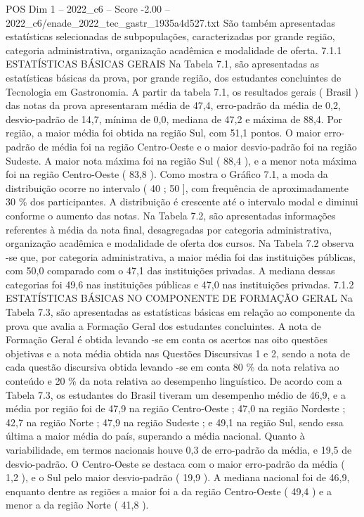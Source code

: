 \begin{textsample}{POS Dim 1 – 2022\_c6 – Score -2.00 – 2022\_c6/enade\_2022\_tec\_gastr\_1935a4d527.txt}
São também apresentadas estatísticas selecionadas de subpopulações, caracterizadas por grande região, categoria administrativa, organização acadêmica e modalidade de oferta. 7.1.1 ESTATÍSTICAS BÁSICAS GERAIS Na Tabela 7.1, são apresentadas as estatísticas básicas da prova, por grande região, dos estudantes concluintes de Tecnologia em Gastronomia.
A partir da tabela 7.1, os resultados gerais ( Brasil ) das notas da prova apresentaram média de 47,4, erro-padrão da média de 0,2, desvio-padrão de 14,7, mínima de 0,0, mediana de 47,2 e máxima de 88,4.
Por região, a maior média foi obtida na região Sul, com 51,1 pontos.
O maior erro-padrão de média foi na região Centro-Oeste e o maior desvio-padrão foi na região Sudeste.
A maior nota máxima foi na região Sul ( 88,4 ), e a menor nota máxima foi na região Centro-Oeste ( 83,8 ).
Como mostra o Gráfico 7.1, a moda da distribuição ocorre no intervalo ( 40 ; 50 ], com frequência de aproximadamente 30 \% dos participantes.
A distribuição é crescente até o intervalo modal e diminui conforme o aumento das notas.
Na Tabela 7.2, são apresentadas informações referentes à média da nota final, desagregadas por categoria administrativa, organização acadêmica e modalidade de oferta dos cursos.
Na Tabela 7.2 observa -se que, por categoria administrativa, a maior média foi das instituições públicas, com 50,0 comparado com o 47,1 das instituições privadas.
A mediana dessas categorias foi 49,6 nas instituições públicas e 47,0 nas instituições privadas. 7.1.2 ESTATÍSTICAS BÁSICAS NO COMPONENTE DE FORMAÇÃO GERAL Na Tabela 7.3, são apresentadas as estatísticas básicas em relação ao componente da prova que avalia a Formação Geral dos estudantes concluintes.
A nota de Formação Geral é obtida levando -se em conta os acertos nas oito questões objetivas e a nota média obtida nas Questões Discursivas 1 e 2, sendo a nota de cada questão discursiva obtida levando -se em conta 80 \% da nota relativa ao conteúdo e 20 \% da nota relativa ao desempenho linguístico.
De acordo com a Tabela 7.3, os estudantes do Brasil tiveram um desempenho médio de 46,9, e a média por região foi de 47,9 na região Centro-Oeste ; 47,0 na região Nordeste ; 42,7 na região Norte ; 47,9 na região Sudeste ; e 49,1 na região Sul, sendo essa última a maior média do país, superando a média nacional.
Quanto à variabilidade, em termos nacionais houve 0,3 de erro-padrão da média, e 19,5 de desvio-padrão.
O Centro-Oeste se destaca com o maior erro-padrão da média ( 1,2 ), e o Sul pelo maior desvio-padrão ( 19,9 ).
A mediana nacional foi de 46,9, enquanto dentre as regiões a maior foi a da região Centro-Oeste ( 49,4 ) e a menor a da região Norte ( 41,8 ).

\end{textsample}
